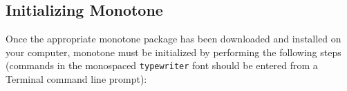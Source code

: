 \documentclass[12pt]{article}
\begin{document}

\subsection*{Initializing Monotone}

Once the appropriate monotone package has been downloaded and installed on your computer, monotone must be initialized by performing the following steps (commands in the monospaced {\tt typewriter} font should be entered from a Terminal command line prompt):
\end{document}
